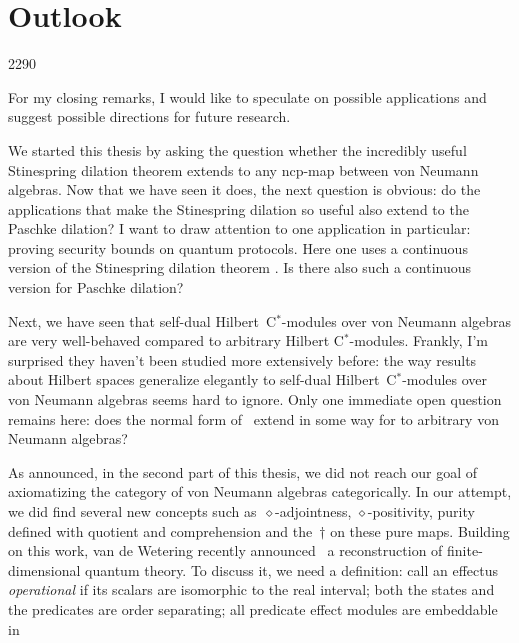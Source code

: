 
\chapter{Outlook}
\begin{parsec}{2290}%
\begin{point}{10}%
For my closing remarks, I would like to speculate
    on possible applications
    and suggest possible
        directions for future research.

We started this thesis by asking the question
    whether the incredibly useful Stinespring dilation theorem
    extends to any ncp-map between von Neumann algebras.
Now that we have seen it does, the next question is obvious:
    do the applications that make the Stinespring dilation so useful
    also extend to the Paschke dilation?
I want to draw attention to one application in particular:
    proving security bounds on quantum protocols.
Here one uses a continuous version
    of the Stinespring dilation theorem \cite{werner2}.
Is there also such a continuous version for Paschke dilation?
\begin{point}{20}%
Next, we have seen that self-dual Hilbert~C$^*$-modules
    over von Neumann algebras
    are very well-behaved compared
    to arbitrary Hilbert C$^*$-modules.
    Frankly, I'm surprised they haven't been studied
        more extensively before:
        the way results about Hilbert spaces
        generalize elegantly to self-dual Hilbert~C$^*$-modules
        over von Neumann algebras seems hard to ignore.
Only one immediate open question remains here:
    does the normal form of~
    extend in some way for to arbitrary von Neumann algebras?
\end{point}
\begin{point}{30}%
As announced, in the second part of this thesis, we did not reach
    our goal of axiomatizing the category of von Neumann algebras
    categorically.
In our attempt, we did find several new concepts
    such as~$\diamond$-adjointness, $\diamond$-positivity,
        purity defined with quotient and comprehension and
        the~$\dagger$ on these pure maps.
Building on this work,
    van de Wetering recently announced~\cite{wetering}
    a reconstruction of finite-dimensional quantum theory.
    To discuss it, we need a definition: call an effectus \emph{operational}
        if its scalars are isomorphic to the real interval;
        both the states and the predicates are order separating;
        all predicate effect modules are embeddable in

\end{point}
\end{point}
\end{parsec}
